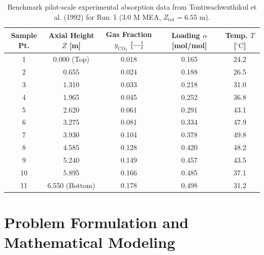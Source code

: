 \documentclass[11pt,a4paper]{article}
\begin{document}
\begin{table}[htbp]
\centering
\caption{Benchmark pilot-scale experimental absorption data from Tontiwachwuthikul et al. (1992) \cite{tontiwachwuthikul1992co2} for Run~1 ($3.0\text{ M}$ MEA, $Z_{\text{tot}} = 6.55\text{ m}$).}
\label{tab:benchmark_data}
\begin{tabular}{ccccc}
\toprule
\textbf{Sample Pt.} & \textbf{Axial Height $Z$ [m]} & \textbf{Gas Fraction $y_{\text{CO}_2}$ [---]} & \textbf{Loading $\alpha$ [mol/mol]} & \textbf{Temp. $T$ [$^\circ\text{C}$]} \\
\midrule
1  & 0.000 (Top)   & 0.018 & 0.165 & 24.2 \\
2  & 0.655         & 0.024 & 0.188 & 26.5 \\
3  & 1.310         & 0.033 & 0.218 & 31.0 \\
4  & 1.965         & 0.045 & 0.252 & 36.8 \\
5  & 2.620         & 0.061 & 0.291 & 43.1 \\
6  & 3.275         & 0.081 & 0.334 & 47.9 \\
7  & 3.930         & 0.104 & 0.378 & 49.8 \\
8  & 4.585         & 0.128 & 0.420 & 48.2 \\
9  & 5.240         & 0.149 & 0.457 & 43.5 \\
10 & 5.895         & 0.166 & 0.485 & 37.1 \\
11 & 6.550 (Bottom)& 0.178 & 0.498 & 31.2 \\
\bottomrule
\end{tabular}
\end{table}

\section{Problem Formulation and Mathematical Modeling}
\end{document}
